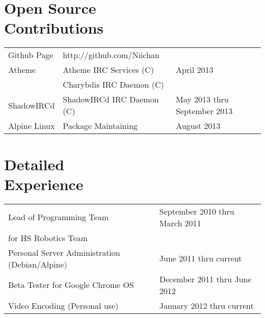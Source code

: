 \documentclass[line, margin]{res}
\begin{document}
\address{5539 Columbia Pike apt 809 \\ Arlington, VA 22204 \\ +1 (425) 221-7761}
     
\begin{resume}

\section{Open Source \\ Contributions}
\begin{tabular}{l l l}
 Github Page & \hfill http://github.com/Niichan & \\ [5pt]
 Atheme & \hfill Atheme IRC Services (C) & April 2013 \\ 
 & \hfill Charybdis IRC Daemon (C) \\ [5pt]
 ShadowIRCd & \hfill ShadowIRCd IRC Daemon (C) & May 2013 thru September 2013 \\ [5pt]
 Alpine Linux & \hfill Package Maintaining & August 2013 \\
\end{tabular}

\section{Detailed \\ Experience}
\begin{tabular}{l l}
 Lead of Programming Team & \hfill September 2010 thru March 2011 \\ 
 for HS Robotics Team & \\ [6pt]
 Personal Server Administration (Debian/Alpine) & \hfill June 2011 thru current  \\ [6pt]
 Beta Tester for Google Chrome OS & \hfill December 2011 thru June 2012 \\ [6pt]
 Video Encoding (Personal use) & January 2012 thru current \\ [6pt]
\end{tabular}
   

\end{resume}
\end{document}
